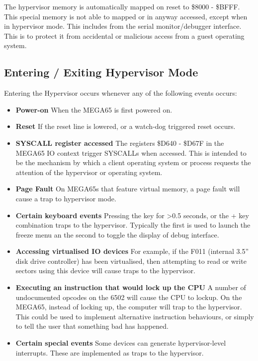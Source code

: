 The hypervisor memory is automatically mapped on reset to \$8000 - \$BFFF.  This special memory is not
able to mapped or in anyway accessed, except when in hypervisor mode. This includes from the serial monitor/debugger
interface.  This is to protect it from accidental or malicious access from a guest operating system.

\subsection{Entering / Exiting Hypervisor Mode}

Entering the Hypervisor occurs whenever any of the following events occurs:

\begin{itemize}
\item{\bf Power-on} When the MEGA65 is first powered on.
\item{\bf Reset} If the reset line is lowered, or a watch-dog triggered reset occurs.
\item{\bf SYSCALL register accessed} The registers \$D640 - \$D67F in the MEGA65 IO context trigger SYSCALLs when accessed.
  This is intended to be the mechanism by which a client operating system or process requests the attention of the hypervisor or operating system.
\item{\bf Page Fault} On MEGA65s that feature virtual memory, a page fault will cause a trap to hypervisor mode.
\item{\bf Certain keyboard events} Pressing the  key for >0.5 seconds, or the  +  key combination traps to the hypervisor.  Typically the first is used to launch the freeze menu an the second to toggle the display of debug interface.
\item{\bf Accessing virtualised IO devices} For example, if the F011 (internal 3.5'' disk drive controller) has been virtualised, then attempting to read or write sectors using this device will cause traps to the hypervisor.
  \item{\bf Executing an instruction that would lock up the CPU} A number of undocumented opcodes on the 6502 will cause the CPU to lockup.  On the MEGA65, instead of locking up, the computer will trap to the hypervisor.  This could be used to implement alternative instruction behaviours, or simply to tell the user that something bad has happened.
  \item{\bf Certain special events} Some devices can generate hypervisor-level interrupts. These are implemented as traps to the hypervisor.
\end{itemize}

